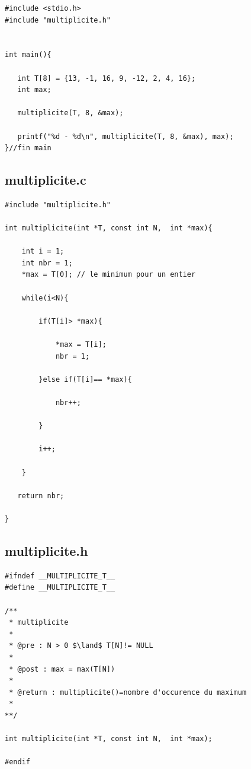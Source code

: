 \documentclass[a4paper, 11pt, oneside]{article}
\begin{document}
\begin{lstlisting}[caption={Main.c}]
#include <stdio.h>
#include "multiplicite.h"


int main(){

   int T[8] = {13, -1, 16, 9, -12, 2, 4, 16};
   int max;

   multiplicite(T, 8, &max);

   printf("%d - %d\n", multiplicite(T, 8, &max), max);
}//fin main
\end{lstlisting}


\subsection{multiplicite.c}

\begin{lstlisting}[caption={multiplicite.c}]
#include "multiplicite.h"

int multiplicite(int *T, const int N,  int *max){
   
    int i = 1;
    int nbr = 1;
    *max = T[0]; // le minimum pour un entier 

    while(i<N){

        if(T[i]> *max){

            *max = T[i];
            nbr = 1;

        }else if(T[i]== *max){

            nbr++;

        }

        i++;

    }

   return nbr;

}
\end{lstlisting}


\subsection{multiplicite.h}

\begin{lstlisting}[caption={multiplicite.h}]
#ifndef __MULTIPLICITE_T__
#define __MULTIPLICITE_T__

/**
 * multiplicite
 * 
 * @pre : N > 0 $\land$ T[N]!= NULL
 * 
 * @post : max = max(T[N]) 
 * 
 * @return : multiplicite()=nombre d'occurence du maximum 
 * 
**/

int multiplicite(int *T, const int N,  int *max);

#endif
\end{lstlisting}
\end{document}
